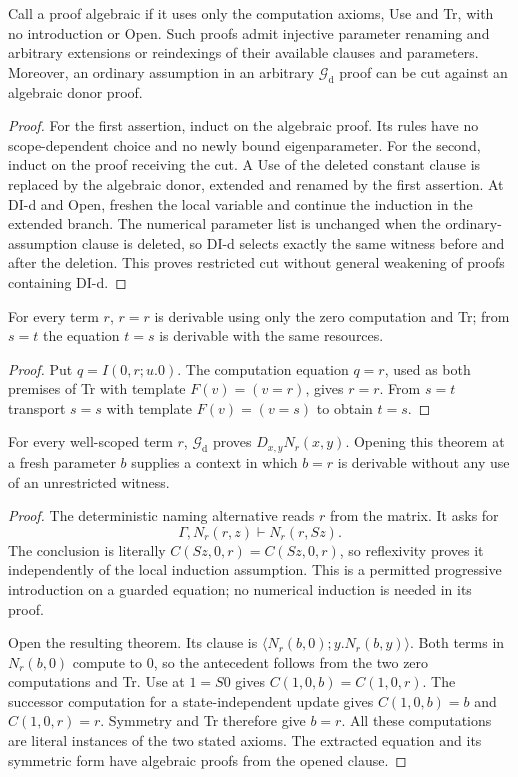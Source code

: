 \begin{lemma}
Call a proof algebraic if it uses only the computation axioms, Use and Tr,
with no introduction or Open. Such proofs admit injective parameter renaming
and arbitrary extensions or reindexings of their available clauses and
parameters. Moreover, an ordinary assumption in an arbitrary
$\mathcal G_{\mathrm d}$ proof can be cut against an algebraic donor proof.
\end{lemma}
\begin{proof}
For the first assertion, induct on the algebraic proof. Its rules have no
scope-dependent choice and no newly bound eigenparameter. For the second,
induct on the proof receiving the cut. A Use of the deleted constant clause
is replaced by the algebraic donor, extended and renamed by the first
assertion. At DI-d and Open, freshen the local variable and continue the
induction in the extended branch. The numerical parameter list is unchanged
when the ordinary-assumption clause is deleted, so DI-d selects exactly the
same witness before and after the deletion. This proves restricted cut
without general weakening of proofs containing DI-d.
\end{proof}

\begin{lemma}
For every term $r$, $r=r$ is derivable using only the zero computation and Tr;
from $s=t$ the equation $t=s$ is derivable with the same resources.
\end{lemma}
\begin{proof}
Put $q=I(0,r;u.0)$. The computation equation $q=r$, used as both premises of
Tr with template $F(v)=(v=r)$, gives $r=r$. From $s=t$ transport $s=s$ with
template $F(v)=(v=s)$ to obtain $t=s$.
\end{proof}

\begin{lemma}
For every well-scoped term $r$, $\mathcal G_{\mathrm d}$ proves
$D_{x,y}N_r(x,y)$. Opening this theorem at a fresh parameter $b$ supplies a
context in which $b=r$ is derivable without any use of an unrestricted witness.
\end{lemma}
\begin{proof}
The deterministic naming alternative reads $r$ from the matrix. It asks for
\[
 \Gamma,N_r(r,z)\vdash N_r(r,Sz).
\]
The conclusion is literally
$C(Sz,0,r)=C(Sz,0,r)$, so reflexivity proves it independently of the local
induction assumption. This is a permitted progressive introduction on a
guarded equation; no numerical induction is needed in its proof.

Open the resulting theorem. Its clause is
$\langle N_r(b,0);y.N_r(b,y)\rangle$. Both terms in $N_r(b,0)$ compute to
$0$, so the antecedent follows from the two zero computations and Tr.
Use at $1=S0$ gives $C(1,0,b)=C(1,0,r)$. The successor computation for a
state-independent update gives $C(1,0,b)=b$ and $C(1,0,r)=r$. Symmetry and Tr
therefore give $b=r$. All these computations are literal instances of the
two stated axioms. The extracted equation and its symmetric form have
algebraic proofs from the opened clause.
\end{proof}

